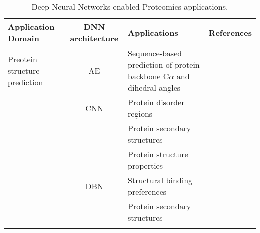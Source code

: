 \begin{table}[h!]
\centering
\begin{tabular}{|| l | c | l | l ||}
    \hline
    Application Domain & DNN architecture & Applications & References\\
    \hline \hline
    Preotein structure prediction & AE & Sequence-based prediction of protein backbone C$\alpha$ and dihedral angles & \\
    & CNN & Protein disorder regions & \\
    &     & Protein secondary structures & \\
    &     & Protein structure properties & \\
    & DBN & Structural binding preferences & \\
    &     & Protein secondary structures & \\
    &     
    \hline
\end{tabular}
\caption{Deep Neural Networks enabled Proteomics applications.}
\label{tab:PS-DNN}
\end{table}